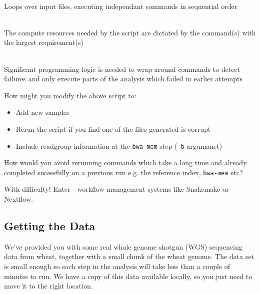 \begin{description}[style=multiline,labelindent=0cm,align=left,leftmargin=0.5cm]
  \item[Not parallelised]\hfill\\
    Loops over input files, executing independant commands in sequential order
  \item[Resources over-specified]\hfill\\
    The compute resources needed by the script are dictated by the command(s) with the largest requirement(s)
  \item[Not idempotent]\hfill\\
    Significant programming logic is needed to wrap around commands to detect failures and only execute parts of the analysis which failed in earlier attempts
\end{description}

\begin{questions}

How might you modify the above script to:

\begin{itemize}
  \item Add new samples
  \item Rerun the script if you find one of the files generated is corrupt
  \item Include readgroup information at the \texttt{bwa-mem} step (\texttt{-b} argumanet)
\end{itemize}

How would you avoid rerunning commands which take a long time and already completed sucessfully on a previous run e.g. the reference index, \texttt{bwa-mem} etc?

\begin{answer}

With difficulty!
Enter - workflow management systems like Snakemake or Nextflow.

\end{answer}

\end{questions}

\subsection{Getting the Data}

We've provided you with some real whole genome shotgun (WGS) sequencing data from wheat, together with a small chunk of the wheat genome.
The data set is small enough so each step in the analysis will take less than a couple of minutes to run.
We have a copy of this data available locally, so you just need to move it to the right location.

